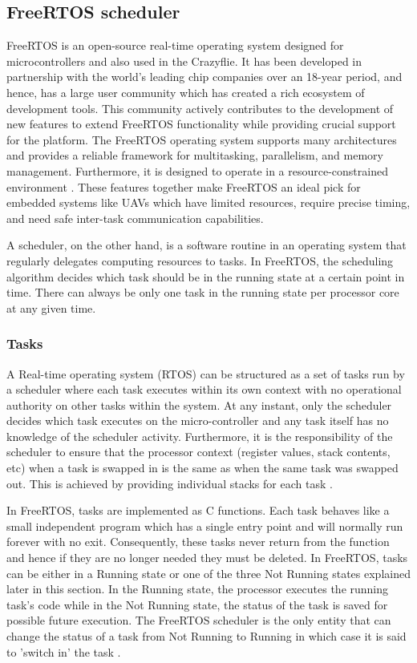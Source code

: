 \documentclass[10pt, a4paper]{article}
\begin{document}
    \subsection{FreeRTOS scheduler}
    FreeRTOS is an open-source real-time operating system designed for microcontrollers and also used in the Crazyflie. It has been developed in partnership with the world's leading chip companies over an 18-year period, and hence, has a large user community which has created a rich ecosystem of development tools. This community actively contributes to the development of new features to extend FreeRTOS functionality while providing crucial support for the platform. The FreeRTOS operating system supports many architectures and provides a reliable framework for multitasking, parallelism, and memory management. Furthermore, it is designed to operate in a resource-constrained environment \cite{web:freertos-kernel}. These features together make FreeRTOS an ideal pick for embedded systems like UAVs which have limited resources, require precise timing, and need safe inter-task communication capabilities.

    A scheduler, on the other hand, is a software routine in an operating system that regularly delegates computing resources to tasks. In FreeRTOS, the scheduling algorithm decides which task should be in the running state at a certain point in time. There can always be only one task in the running state per processor core at any given time.

    \subsubsection{Tasks}
    \label{section:freeRTOS_tasks}
    A Real-time operating system (RTOS) can be structured as a set of tasks run by a scheduler where each task executes within its own context with no operational authority on other tasks within the system. At any instant, only the scheduler decides which task executes on the micro-controller and any task itself has no knowledge of the scheduler activity. Furthermore, it is the responsibility of the scheduler to ensure that the processor context (register values, stack contents, etc) when a task is swapped in is the same as when the same task was swapped out. This is achieved by providing individual stacks for each task \cite{web:tasks-and-coroutines}.

    In FreeRTOS, tasks are implemented as C functions. Each task behaves like a small independent program which has a single entry point and will normally run forever with no exit. Consequently, these tasks never return from the function and hence if they are no longer needed they must be deleted. In FreeRTOS, tasks can be either in a Running state or one of the three Not Running states explained later in this section. In the Running state, the processor executes the running task's code while in the Not Running state, the status of the task is saved for possible future execution. The FreeRTOS scheduler is the only entity that can change the status of a task from Not Running to Running in which case it is said to 'switch in' the task \cite{book:freertos-guide-tasks}.
\end{document}
